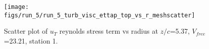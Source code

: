 \begin{figure}[H]
\centering
\texttt{[image: figs/run\_5/run\_5\_turb\_visc\_ettap\_top\_vs\_r\_meshscatter]}
\caption{Scatter plot of $
u_T$ reynolds stress term vs radius at $z/c$=5.37, $V_{free}$=23.21, station 1.}
\label{fig:run_5_turb_visc_ettap_top_vs_r_meshscatter}
\end{figure}


